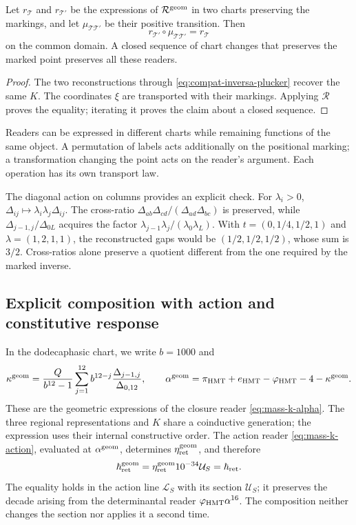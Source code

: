 \begin{corollary}
\label{cor:compat-mutaciones}
Let \(r_{\mathcal T}\) and \(r_{\mathcal T'}\) be the expressions
of \(\mathcal R^{\rm geom}\) in two charts preserving the markings,
and let \(\mu_{\mathcal T\mathcal T'}\) be their positive transition. Then
\[
 r_{\mathcal T'}\circ\mu_{\mathcal T\mathcal T'}
 =r_{\mathcal T}
\]
on the common domain. A closed sequence of chart changes that
preserves the marked point preserves all these readers.
\end{corollary}
\begin{proof}
The two reconstructions through
\eqref{eq:compat-inversa-plucker} recover the same \(K\).
The coordinates \(\xi\) are transported with their markings. Applying
\(\mathcal R\) proves the equality; iterating it proves the claim
about a closed sequence.
\end{proof}

Readers can be expressed in different charts while remaining
functions of the same object. A permutation of labels acts
additionally on the positional marking; a transformation changing
the point acts on the reader's argument. Each operation has
its own transport law.

The diagonal action on columns provides an explicit check.
For \(\lambda_i>0\),
\(\Delta_{ij}\mapsto\lambda_i\lambda_j\Delta_{ij}\).
The cross-ratio \(\Delta_{ab}\Delta_{cd}/
(\Delta_{ad}\Delta_{bc})\) is preserved, while
\(\Delta_{j-1,j}/\Delta_{0L}\) acquires the factor
\(\lambda_{j-1}\lambda_j/(\lambda_0\lambda_L)\).
With \(t=(0,1/4,1/2,1)\) and \(\lambda=(1,2,1,1)\), the
reconstructed gaps would be \((1/2,1/2,1/2)\), whose sum
is \(3/2\). Cross-ratios alone preserve a quotient different
from the one required by the marked inverse.

\subsection{Explicit composition with action and constitutive response}

In the dodecaphasic chart, we write \(b=1000\) and
\begin{equation}
 \kappa^{\rm geom}=
 \frac{Q}{b^{12}-1}\sum_{j=1}^{12}
 b^{12-j}\frac{\Delta_{j-1,j}}{\Delta_{0,12}},
 \qquad
 \alpha^{\rm geom}=\pi_{\rm HMT}+e_{\rm HMT}
 -\varphi_{\rm HMT}-4-\kappa^{\rm geom}.
 \label{eq:compat-alpha-geometrica}
\end{equation}
These are the geometric expressions of the closure reader
\eqref{eq:mass-k-alpha}. The three regional representations and \(K\)
share a coinductive generation; the expression uses their internal
constructive order. The action reader
\eqref{eq:mass-k-action}, evaluated at \(\alpha^{\rm geom}\),
determines \(\eta_{\rm ret}^{\rm geom}\), and therefore
\[
 \hbar_{\rm ret}^{\rm geom}
 =\eta_{\rm ret}^{\rm geom}10^{-34}\mathcal U_S
 =\hbar_{\rm ret}.
\]
The equality holds in the action line \(\mathcal L_S\)
with its section \(\mathcal U_S\); it preserves the decade arising
from the determinantal reader \(\varphi_{\rm HMT}\alpha^{16}\).
The composition neither changes the section nor applies it a second time.

